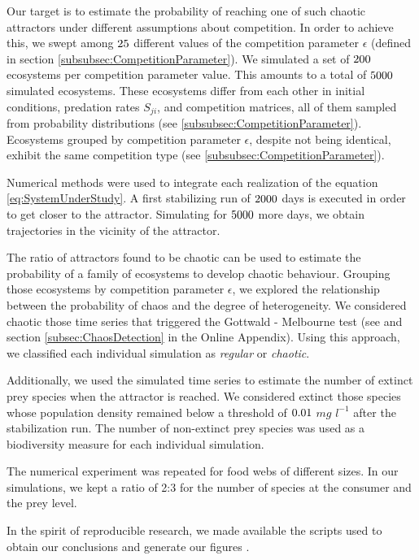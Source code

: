 Our target is to estimate the probability of reaching one of such chaotic attractors under different assumptions about competition. In order to achieve this, we swept among $25$ different values of the competition parameter $\epsilon$ (defined in section \ref{subsubsec:CompetitionParameter}). We simulated a set of $200$ ecosystems per competition parameter value. This amounts to a total of $5000$ simulated ecosystems. These ecosystems differ from each other in initial conditions, predation rates $S_{ji}$, and competition matrices, all of them sampled from probability distributions (see \ref{subsubsec:CompetitionParameter}). Ecosystems grouped by competition parameter $\epsilon$, despite not being identical, exhibit the same competition type (see \ref{subsubsec:CompetitionParameter}).

Numerical methods were used to integrate each realization of the equation \eqref{eq:SystemUnderStudy}. A first stabilizing run of $ 2000 $ days is executed in order to get closer to the attractor. Simulating for $ 5000 $ more days, we obtain trajectories in the vicinity of the attractor.

The ratio of attractors found to be chaotic can be used to estimate the probability of a family of ecosystems to develop chaotic behaviour. Grouping those ecosystems by competition parameter $\epsilon$, we explored the relationship between the probability of chaos and the degree of heterogeneity. We considered chaotic those time series that triggered the Gottwald - Melbourne test (see \citet{Gottwald2009} and section \ref{subsec:ChaosDetection} in the Online Appendix). Using this approach, we classified each individual simulation as \textit{regular} or \textit{chaotic}.

Additionally, we used the simulated time series to estimate the number of extinct prey species when the attractor is reached. We considered extinct those species whose population density remained below a threshold of $0.01$ $mg$ $l^{-1}$ after the stabilization run. The number of non-extinct prey species was used as a biodiversity measure for each individual simulation.

The numerical experiment was repeated for food webs of different sizes. In our simulations, we kept a ratio of 2:3 for the number of species at the consumer and the prey level.

In the spirit of reproducible research, we made available the scripts used to obtain our conclusions and generate our figures \citep{Rodriguez-Sanchez-code-neuchaos}.
